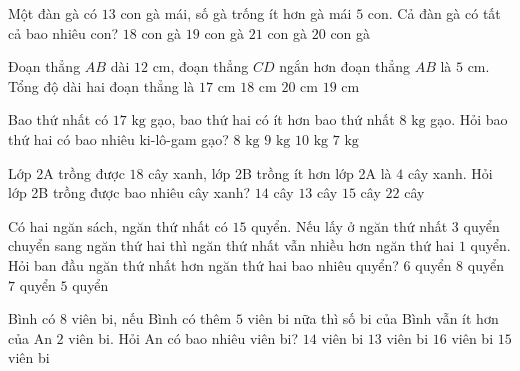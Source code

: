 \begin{ex} %
Một đàn gà có $13$ con gà mái, số gà trống ít hơn gà mái $5$ con. Cả đàn gà có tất cả bao nhiêu con?
\choice
{$18$ con gà}
{$19$ con gà}
{\True $21$ con gà}
{$20$ con gà}
\end{ex}

\begin{ex} %
Đoạn thẳng $AB$ dài $12\text{ cm}$, đoạn thẳng $CD$ ngắn hơn đoạn thẳng $AB$ là $5\text{ cm}$. Tổng độ dài hai đoạn thẳng là
\choice
{$17\text{ cm}$}
{$18\text{ cm}$}
{$20\text{ cm}$}
{\True $19\text{ cm}$}
\end{ex}

\begin{ex} %
Bao thứ nhất có $17\text{ kg}$ gạo, bao thứ hai có ít hơn bao thứ nhất $8\text{ kg}$ gạo. Hỏi bao thứ hai có bao nhiêu ki-lô-gam gạo?
\choice
{$8\text{ kg}$}
{\True $9\text{ kg}$}
{$10\text{ kg}$}
{$7\text{ kg}$}
\end{ex}

\begin{ex} %
Lớp 2A trồng được $18$ cây xanh, lớp 2B trồng ít hơn lớp 2A là $4$ cây xanh. Hỏi lớp 2B trồng được bao nhiêu cây xanh?
\choice
{\True $14$ cây}
{$13$ cây}
{$15$ cây}
{$22$ cây}
\end{ex}

\begin{ex} %
Có hai ngăn sách, ngăn thứ nhất có $15$ quyển. Nếu lấy ở ngăn thứ nhất $3$ quyển chuyển sang ngăn thứ hai thì ngăn thứ nhất vẫn nhiều hơn ngăn thứ hai $1$ quyển. Hỏi ban đầu ngăn thứ nhất hơn ngăn thứ hai bao nhiêu quyển?
\choice
{$6$ quyển}
{$8$ quyển}
{\True $7$ quyển}
{$5$ quyển}
\end{ex}

\begin{ex} %
Bình có $8$ viên bi, nếu Bình có thêm $5$ viên bi nữa thì số bi của Bình vẫn ít hơn của An $2$ viên bi. Hỏi An có bao nhiêu viên bi?
\choice
{$14$ viên bi}
{$13$ viên bi}
{$16$ viên bi}
{\True $15$ viên bi}
\end{ex}

